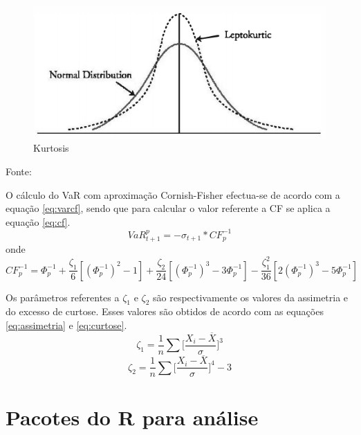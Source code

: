 \documentclass[
  12pt,
  a4paper,
  openany]{book}
\begin{document}
\begin{figure}

{\centering \includegraphics[width=0.6\linewidth]{image/kurtosis} 

}

\caption{Kurtosis}\label{fig:quant}
\end{figure}
\centering

Fonte: \citep[pp.46]{quant}

\justifying

O cálculo do VaR com aproximação Cornish-Fisher efectua-se de acordo com a equação \eqref{eq:varcf}, sendo que para calcular o valor referente a CF se aplica a equação \eqref{eq:cf}.
\begin{equation} 
  VaR_{t+1}^{p} = -\sigma_{t+1}*CF_{p}^{-1}
  \label{eq:varcf}
\end{equation}
onde
\begin{equation} 
  CF_{p}^{-1} = \Phi_{p}^{-1} + \frac{\zeta_{1}}{6}[(\Phi_{p}^{-1})^2-1] + \frac{\zeta_{2}}{24}[(\Phi_{p}^{-1})^3-3\Phi_{p}^{-1}] - \frac{\zeta_{1}^{2}}{36}[2(\Phi_{p}^{-1})^3-5\Phi_{p}^{-1}]
  \label{eq:cf}
\end{equation}

Os parâmetros referentes a \(\zeta_1\) e \(\zeta_2\) são respectivamente os valores da assimetria e do excesso de curtose. Esses valores são obtidos de acordo com as equações \eqref{eq:assimetria} e \eqref{eq:curtose}.
\begin{equation} 
 \zeta_1 = \frac{1}{n}\sum\bigg[\frac{X_i - \overline{X}}{\sigma}\bigg]^3
  \label{eq:assimetria}
\end{equation}
\begin{equation} 
 \zeta_2 = \frac{1}{n}\sum\bigg[\frac{X_i - \overline{X}}{\sigma}\bigg]^4 - 3
  \label{eq:curtose}
\end{equation}

\hypertarget{pacotes-do-r-para-anuxe1lise}{%
\chapter{Pacotes do R para análise}\label{pacotes-do-r-para-anuxe1lise}}
\end{document}
